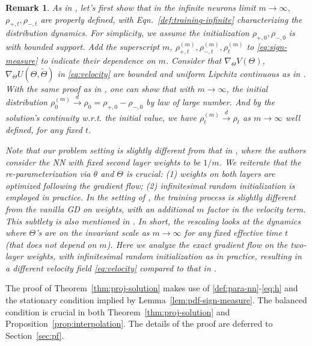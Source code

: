 \documentclass[11pt]{article}
\numberwithin{equation}{section}
\newtheorem{remark}{Remark}[section]
\begin{document}
\begin{remark}
    \rm 
    As in \cite{mei2018mean, rotskoff2018neural}, let's first show that in the infinite neurons limit $m \rightarrow \infty$, $\rho_{+, t}, \rho_{-, t}$ are properly defined, with Eqn.~\eqref{def:training-infinite} characterizing the distribution dynamics. For simplicity, we assume the initialization $\rho_{+,0},\rho_{-,0}$ is with bounded support. Add the superscript $m$, $\rho_{+,t}^{(m)}, \rho_{-,t}^{(m)},\rho_{t}^{(m)}$ to \eqref{eq:sign-measure} to indicate their dependence on $m$. Consider that $\nabla_\Theta V(\Theta)$, $\nabla_{\Theta}U(\Theta,\tilde \Theta)$ in \eqref{eq:velocity} are bounded and uniform Lipchitz continuous as in \cite[A3]{mei2018mean}. With the same proof as in \cite[Theorem 3]{mei2018mean}, one can show that with $m\rightarrow \infty$, the initial distribution $\rho^{(m)}_0 \xrightarrow{d}  \rho_0 = \rho_{+,0} - \rho_{-,0}$ by law of large number. And by the solution's continuity w.r.t. the initial value, we have $\rho_t^{(m)} \xrightarrow{d} \rho_t$ as $m\rightarrow \infty$ well defined, for any fixed $t$.
    
    Note that our problem setting is slightly different from that in \cite{mei2018mean}, where the authors consider the NN with fixed second layer weights to be $1/m$. 
 We reiterate that the re-parameterization via $\theta$ and $\Theta$ is crucial: (1) weights on both layers are optimized following the gradient flow; (2) infinitesimal random initialization is employed in practice. 
    In the setting of \cite[Eqn. (3)]{mei2018mean}, the training process is slightly different from the vanilla GD on weights, with an additional $m$ factor in the velocity term. This subtlety is also mentioned in \cite{rotskoff2018neural}. In short, the rescaling looks at the dynamics where $\Theta$'s are on the invariant scale as $m \rightarrow \infty$ for any fixed effective time $t$ (that does not depend on $m$).
    Here we analyze the exact gradient flow on the two-layer weights, with infinitesimal random initialization as in practice, resulting in a different velocity field \eqref{eq:velocity} compared to that in \cite{mei2018mean}. 
    
\end{remark}




The proof of Theorem~\ref{thm:proj-solution} makes use of \eqref{def:para-nn}-\eqref{eq:h} and the stationary condition implied by Lemma~\ref{lem:pdf-sign-measure}. The balanced condition is crucial in both Theorem~\ref{thm:proj-solution} and Proposition~\ref{prop:interpolation}.
The details of the proof are deferred to Section~\ref{sec:pf}.
\end{document}
